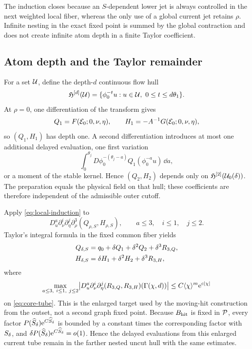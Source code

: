 The induction closes because an \(S\)-dependent lower jet is always
controlled in the next weighted local fiber, whereas the only use of a
global current jet retains \(\rho\).  Infinite nesting in the exact fixed
point is summed by the global contraction and does not create infinite atom
depth in a finite Taylor coefficient.

\subsection{Atom depth and the Taylor remainder}

For a set \(\mathcal U\), define the depth-\(d\) continuous flow hull
\[
 \mathfrak H^{[d]}(\mathcal U)
 =\{\phi_0^{-t}u:u\in\mathcal U,\ 0\le t\le d\theta_1\}.
\]
At \(\rho=0\), one differentiation of the transform gives
\[
 Q_1=F(\mathcal E_0;0,\nu,\eta),\qquad
 H_1=-A^{-1}G(\mathcal E_0;0,\nu,\eta),
\]
so \((Q_1,H_1)\) has depth one.  A second differentiation introduces at
most one additional delayed evaluation, one first variation
\[
 \int_0^{\theta_j}
 D\phi_0^{-(\theta_j-a)}
 Q_1(\phi_0^{-a}u)\,\dd a,
\]
or a moment of the stable kernel.  Hence \((Q_2,H_2)\) depends only on
\(\mathfrak H^{[2]}(\mathcal U_0(\delta))\).  The preparation equals the
physical field on that hull; these coefficients are therefore independent
of the admissible outer cutoff.

Apply \cref{eq:local-induction} to
\[
 D_u^a\partial_\nu^i\partial_\eta^j
 \partial_\rho^3(Q_{\rho,S},H_{\rho,S}),
 \qquad a\le3,\quad i\le1,\quad j\le2.
\]
Taylor's integral formula in the fixed common fiber yields
\begin{align}
 Q_{\delta,S}&=q_0+\delta Q_1+\delta^2Q_2+\delta^3R_{3,Q},\\
 H_{\delta,S}&=\delta H_1+\delta^2H_2+\delta^3R_{3,H},
 \label{eq:appendix-growing-expansion}
\end{align}
where
\begin{equation}
\label{eq:appendix-growing-remainder}
 \max_{a\le3,\ i\le1,\ j\le2}
 \bigl|D_u^a\partial_\nu^i\partial_\eta^j
      (R_{3,Q},R_{3,H})(\Gamma(\chi,d))\bigr|
 \le C\langle\chi\rangle^m\mathrm e^{c|\chi|}
\end{equation}
on \cref{eq:core-tube}.  This is the enlarged target used by the moving-hit
construction from the outset, not a second graph fixed point.  Because
\(B_{\rm hit}\) is fixed in \(\mathcal P\), every factor
\(P(\widehat S_\delta)\mathrm e^{C\widehat S_\delta}\) is bounded by a constant times
the corresponding factor with \(S_\delta\), and
\(\delta P(\widehat S_\delta)\mathrm e^{C\widehat S_\delta}=o(1)\).  Hence the delayed
evaluations from this enlarged current tube remain in the farther nested
uncut hull with the same estimates.

